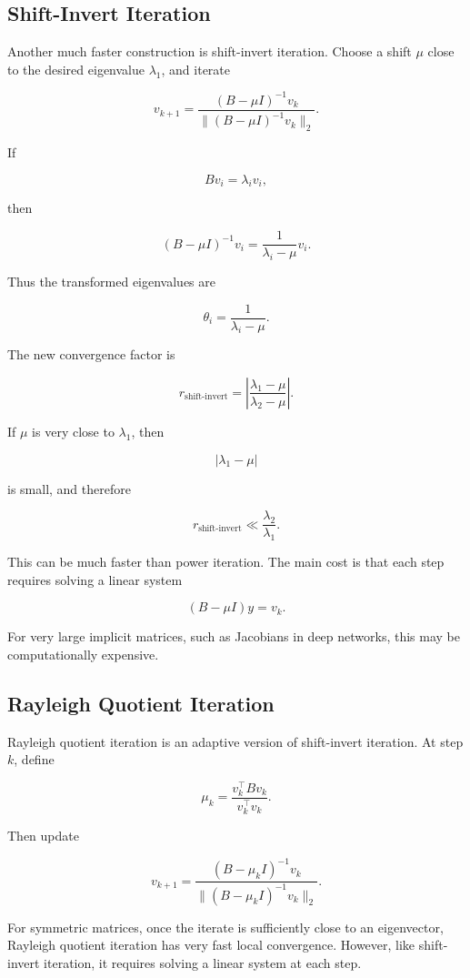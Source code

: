 \documentclass{article}
\begin{document}
\subsection{Shift-Invert Iteration}

Another much faster construction is shift-invert iteration. Choose a shift \(\mu\) close to the desired eigenvalue \(\lambda_1\), and iterate

\[
v_{k+1}
=
\frac{(B-\mu I)^{-1}v_k}
{\|(B-\mu I)^{-1}v_k\|_2}.
\]

If

\[
Bv_i=\lambda_i v_i,
\]

then

\[
(B-\mu I)^{-1}v_i
=
\frac{1}{\lambda_i-\mu}v_i.
\]

Thus the transformed eigenvalues are

\[
\theta_i
=
\frac{1}{\lambda_i-\mu}.
\]

The new convergence factor is

\[
r_{\mathrm{shift\text{-}invert}}
=
\left|
\frac{\lambda_1-\mu}
{\lambda_2-\mu}
\right|.
\]

If \(\mu\) is very close to \(\lambda_1\), then

\[
|\lambda_1-\mu|
\]

is small, and therefore

\[
r_{\mathrm{shift\text{-}invert}}
\ll
\frac{\lambda_2}{\lambda_1}.
\]

This can be much faster than power iteration. The main cost is that each step requires solving a linear system

\[
(B-\mu I)y=v_k.
\]

For very large implicit matrices, such as Jacobians in deep networks, this may be computationally expensive.

\subsection{Rayleigh Quotient Iteration}

Rayleigh quotient iteration is an adaptive version of shift-invert iteration. At step \(k\), define

\[
\mu_k
=
\frac{v_k^\top Bv_k}{v_k^\top v_k}.
\]

Then update

\[
v_{k+1}
=
\frac{(B-\mu_k I)^{-1}v_k}
{\|(B-\mu_k I)^{-1}v_k\|_2}.
\]

For symmetric matrices, once the iterate is sufficiently close to an eigenvector, Rayleigh quotient iteration has very fast local convergence. However, like shift-invert iteration, it requires solving a linear system at each step.
\end{document}
